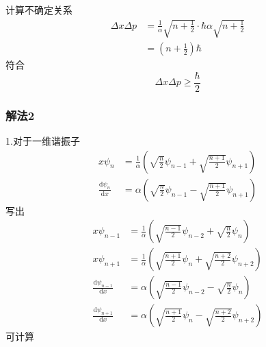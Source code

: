 计算不确定关系
\begin{equation}
    \begin{aligned}
        \Delta x\Delta p&=\frac{1}{\alpha}\sqrt{n+\frac{1}{2}}\cdot \hbar \alpha \sqrt{n+\frac{1}{2}}
\\
&=\left( n+\frac{1}{2} \right) \hbar 
    \end{aligned}
\end{equation}
符合
\begin{equation}
    \Delta x\Delta p\geqslant \frac{\hbar}{2}
\end{equation}

\subsubsection{解法2}
1.对于一维谐振子
\begin{equation}
    \begin{aligned}
        x\psi _n&=\frac{1}{\alpha}\left( \sqrt{\frac{n}{2}}\psi _{n-1}+\sqrt{\frac{n+1}{2}}\psi _{n+1} \right) 
\\
\frac{\mathrm{d}\psi _n}{\mathrm{d}x}&=\alpha \left( \sqrt{\frac{n}{2}}\psi _{n-1}-\sqrt{\frac{n+1}{2}}\psi _{n+1} \right) 
    \end{aligned}
\end{equation}
写出
\begin{equation}
    \begin{aligned}
        x\psi _{n-1}&=\frac{1}{\alpha}\left( \sqrt{\frac{n-1}{2}}\psi _{n-2}+\sqrt{\frac{n}{2}}\psi _n \right) 
\\
x\psi _{n+1}&=\frac{1}{\alpha}\left( \sqrt{\frac{n+1}{2}}\psi _n+\sqrt{\frac{n+2}{2}}\psi _{n+2} \right) 
\\
\frac{\mathrm{d}\psi _{n-1}}{\mathrm{d}x}&=\alpha \left( \sqrt{\frac{n-1}{2}}\psi _{n-2}-\sqrt{\frac{n}{2}}\psi _n \right) 
\\
\frac{\mathrm{d}\psi _{n+1}}{\mathrm{d}x}&=\alpha \left( \sqrt{\frac{n+1}{2}}\psi _n-\sqrt{\frac{n+2}{2}}\psi _{n+2} \right) 
    \end{aligned}
\end{equation}
可计算
